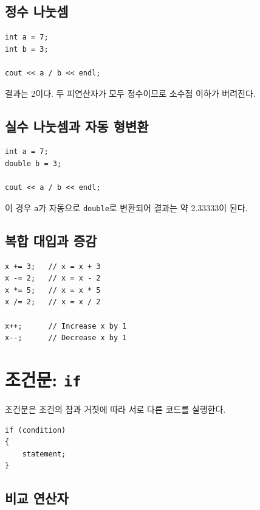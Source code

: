 \documentclass[11pt,a4paper]{article}
\begin{document}
\subsection{정수 나눗셈}

\begin{lstlisting}
int a = 7;
int b = 3;

cout << a / b << endl;
\end{lstlisting}

결과는 2이다. 두 피연산자가 모두 정수이므로 소수점 이하가 버려진다.

\subsection{실수 나눗셈과 자동 형변환}

\begin{lstlisting}
int a = 7;
double b = 3;

cout << a / b << endl;
\end{lstlisting}

이 경우 \texttt{a}가 자동으로 \texttt{double}로 변환되어 결과는 약 2.33333이 된다.

\subsection{복합 대입과 증감}

\begin{lstlisting}
x += 3;   // x = x + 3
x -= 2;   // x = x - 2
x *= 5;   // x = x * 5
x /= 2;   // x = x / 2

x++;      // Increase x by 1
x--;      // Decrease x by 1
\end{lstlisting}

\section{조건문: \texttt{if}}

조건문은 조건의 참과 거짓에 따라 서로 다른 코드를 실행한다.

\begin{lstlisting}
if (condition)
{
    statement;
}
\end{lstlisting}

\subsection{비교 연산자}
\end{document}

